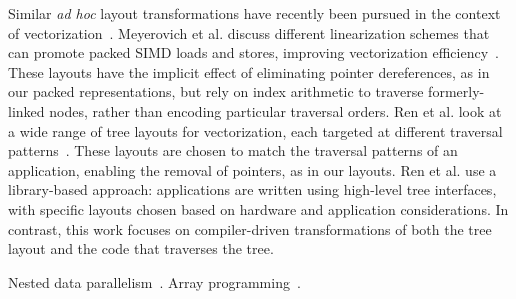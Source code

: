 Similar {\em ad hoc} layout transformations have recently been pursued in the
context of vectorization~\cite{Meyerovich2011,ren13cgo,ren14taco}. Meyerovich
et al. discuss different linearization schemes that can promote packed SIMD
loads and stores, improving vectorization efficiency~\cite{Meyerovich2011}.
These layouts have the implicit effect of eliminating pointer dereferences, as
in our packed representations, but rely on index arithmetic to traverse
formerly-linked nodes, rather than encoding particular traversal orders. Ren
et al. look at a wide range of tree layouts for vectorization, each targeted
at different traversal patterns~\cite{ren13cgo,ren14taco}. These layouts are
chosen to match the traversal patterns of an application, enabling the removal
of pointers, as in our layouts. Ren et al. use a library-based approach:
applications are written using high-level tree interfaces, with specific
layouts chosen based on hardware and application considerations. In contrast,
this work focuses on compiler-driven transformations of both the tree layout
and the code that traverses the tree.

Nested data parallelism~\cite{nested-data-parallel}.
Array programming~\cite{array-programming}.
